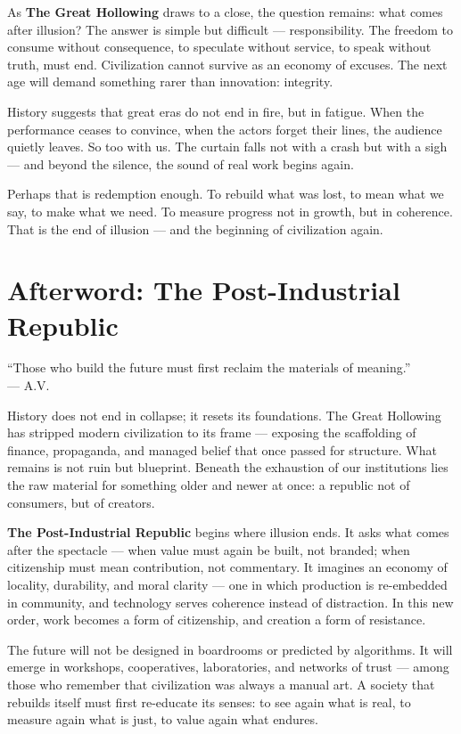 \documentclass[11pt,twoside]{book}
\begin{document}
As \textbf{The Great Hollowing} draws to a close, the question remains: what comes after illusion?  The answer is simple but difficult — responsibility.  The freedom to consume without consequence, to speculate without service, to speak without truth, must end.  Civilization cannot survive as an economy of excuses.  The next age will demand something rarer than innovation: integrity.

History suggests that great eras do not end in fire, but in fatigue.  When the performance ceases to convince, when the actors forget their lines, the audience quietly leaves.  So too with us.  The curtain falls not with a crash but with a sigh — and beyond the silence, the sound of real work begins again.

Perhaps that is redemption enough.  To rebuild what was lost, to mean what we say, to make what we need.  To measure progress not in growth, but in coherence.  That is the end of illusion — and the beginning of civilization again.

\chapter*{Afterword: The Post-Industrial Republic}

\epigraph{
“Those who build the future must first reclaim the materials of meaning.”\\
— A.V.
}{}

History does not end in collapse; it resets its foundations.  
The Great Hollowing has stripped modern civilization to its frame — exposing the scaffolding of finance, propaganda, and managed belief that once passed for structure.  What remains is not ruin but blueprint.  Beneath the exhaustion of our institutions lies the raw material for something older and newer at once: a republic not of consumers, but of creators.

\textbf{The Post-Industrial Republic} begins where illusion ends.  It asks what comes after the spectacle — when value must again be built, not branded; when citizenship must mean contribution, not commentary.  It imagines an economy of locality, durability, and moral clarity — one in which production is re-embedded in community, and technology serves coherence instead of distraction.  In this new order, work becomes a form of citizenship, and creation a form of resistance.

The future will not be designed in boardrooms or predicted by algorithms.  It will emerge in workshops, cooperatives, laboratories, and networks of trust — among those who remember that civilization was always a manual art.  A society that rebuilds itself must first re-educate its senses: to see again what is real, to measure again what is just, to value again what endures.
\end{document}
